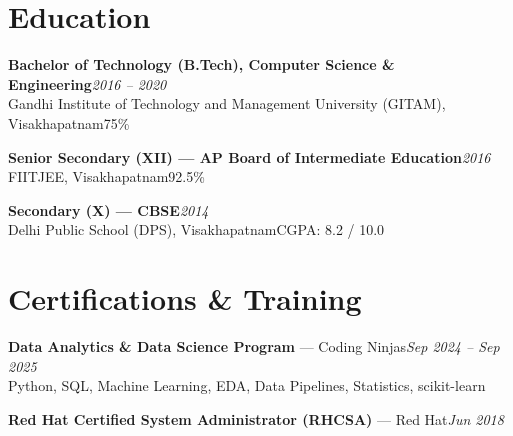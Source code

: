 \documentclass[10pt, letterpaper]{article}
\begin{document}
\section{Education}

{\bfseries Bachelor of Technology (B.Tech), Computer Science \& Engineering}\hfill{\small\color{muted}\textit{2016 -- 2020}}\\
{\small\color{muted}Gandhi Institute of Technology and Management University (GITAM), Visakhapatnam\hfill 75\%}

\vspace{2pt}
{\bfseries Senior Secondary (XII) --- AP Board of Intermediate Education}\hfill{\small\color{muted}\textit{2016}}\\
{\small\color{muted}FIITJEE, Visakhapatnam\hfill 92.5\%}

\vspace{2pt}
{\bfseries Secondary (X) --- CBSE}\hfill{\small\color{muted}\textit{2014}}\\
{\small\color{muted}Delhi Public School (DPS), Visakhapatnam\hfill CGPA: 8.2 / 10.0}

\section{Certifications \& Training}

{\bfseries Data Analytics \& Data Science Program} --- Coding Ninjas\hfill{\small\color{muted}\textit{Sep 2024 -- Sep 2025}}\\
{\small\color{muted}Python, SQL, Machine Learning, EDA, Data Pipelines, Statistics, scikit-learn}

\vspace{1pt}
{\bfseries Red Hat Certified System Administrator (RHCSA)} --- Red Hat\hfill{\small\color{muted}\textit{Jun 2018}}

\end{document}
